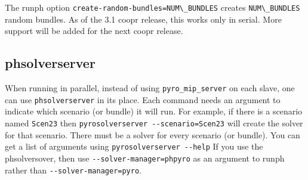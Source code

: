 The runph option \verb|create-random-bundles=NUM\_BUNDLES| creates \verb|NUM\_BUNDLES| random bundles. As of the 3.1 coopr
release, this works only in serial. More support will be added for the next coopr release.

\subsection{phsolverserver}

When running in parallel, instead of using  \verb|pyro_mip_server| on each slave, one can use
\verb|phsolverserver| in its place. Each command needs an argument to indicate which scenario (or bundle)
it will run. For example, if there is a scenario named \verb|Scen23| then \verb|pyrosolverserver --scenario=Scen23|
will create the solver for that scenario. There must be a solver for every scenario (or bundle).
You can get a list of arguments using \verb|pyrosolverserver --help|
If you use the phsolversover, then use \verb|--solver-manager=phpyro| as an argument to runph rather
than \verb|--solver-manager=pyro|.


